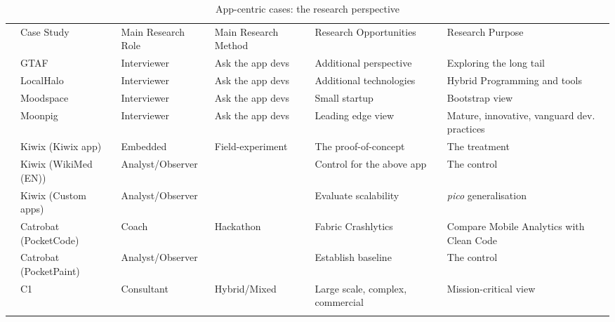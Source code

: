 \begin{table}
    \centering
    \tabcolsep=0.06cm
    \tiny
    \begin{tabular}{clllp{3.5cm}p{3.5cm}}\toprule
    & Case Study                 & Main Research Role &  Main Research Method   & Research Opportunities             & Research Purpose \\
    \arrayrulecolor{blue!70}\midrule
    \multirow{4}{*}{\large {\rotatebox[origin=c]{90}{Interviews}}} & GTAF                       & Interviewer        & Ask the app devs & Additional perspective & Exploring the long tail \\
    & LocalHalo                  & Interviewer        & Ask the app devs & Additional technologies & Hybrid Programming and tools \\
    & Moodspace                  & Interviewer        & Ask the app devs & Small startup &Bootstrap view \\
    & Moonpig                    & Interviewer        & Ask the app devs & Leading edge view & Mature, innovative, vanguard dev. practices \\
    \arrayrulecolor{blue!70}\midrule
    \multirow{6}{*}{\large \rotatebox[origin=c]{90}{\parbox[c]{4cm}{\centering Interventions}}} & Kiwix (Kiwix app)          & Embedded           & Field-experiment   & The proof-of-concept      & The treatment \\ 
    & Kiwix (WikiMed (EN))       & Analyst/Observer   &                    & Control for the above app & The control  \\
    & Kiwix (Custom apps)        & Analyst/Observer   &                    & Evaluate scalability      & \textit{pico} generalisation \\
    \arrayrulecolor{blue!20}\midrule
    & Catrobat (PocketCode)      & Coach              & Hackathon   & Fabric Crashlytics        & Compare Mobile Analytics with Clean Code \\
    & Catrobat (PocketPaint)     & Analyst/Observer   &                    & Establish baseline        & The control  \\
     \midrule
    & C1                         & Consultant         & Hybrid/Mixed & Large scale, complex, commercial & Mission-critical view \\
    \arrayrulecolor{black}\bottomrule
    \end{tabular}
    \caption{App-centric cases: the research perspective}
    \label{tab:app-centric-studies-research-perspective}
\end{table}

